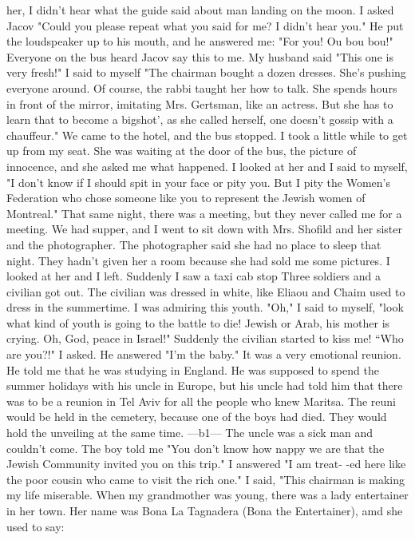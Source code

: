 her, I didn't hear what the guide said about man landing on the moon. 
I asked Jacov "Could you please repeat what you said for me? I didn't 
hear you." He put the loudspeaker up to his mouth, and he answered me: 
"For you! Ou bou bou!" Everyone on the bus heard Jacov say this to me. 
My husband said "This one is very fresh!" I said to myself "The chairman 
bought a dozen dresses. She's pushing everyone around. Of course, the 
rabbi taught her how to talk. She spends hours in front of the mirror, imitating Mrs. Gertsman, like an actress. But she has to learn that to become a bigshot', as she called herself, one doesn't gossip with a chauffeur." 
We came to the hotel, and the bus stopped. I took a little while to 
get up from my seat. She was waiting at the door of the bus, the picture 
of innocence, and she asked me what happened. I looked at her and I said 
to myself, "I don't know if I should spit in your face or pity you. But I 
pity the Women's Federation who chose someone like you to represent the 
Jewish women of Montreal." 
That same night, there was a meeting, but they never called me for a meeting. We had supper, and I went to sit down with Mrs. Shofild and her sister and the photographer. The photographer said she had no place to sleep that night. They hadn't given her a room because she had sold me 
some pictures. I looked at her and I left. Suddenly I saw a taxi cab stop 
Three soldiers and a civilian got out. The civilian was dressed in white, 
like Eliaou and Chaim used to dress in the summertime. I was admiring this 
youth. "Oh," I said to myself, "look what kind of youth is going to the 
battle to die! Jewish or Arab, his mother is crying. Oh, God, peace in 
Israel!" Suddenly the civilian started to kiss me! “Who are you?!" I 
asked. He answered "I'm the baby." It was a very emotional reunion. He 
told me that he was studying in England. He was supposed to spend the summer 
holidays with his uncle in Europe, but his uncle had told him that there was
to be a reunion in Tel Aviv for all the people who knew Maritsa. The reuni 
would be held in the cemetery, because one of the boys had died. They would 
hold the unveiling at the same time. 
—b1— 
The uncle was a sick man and couldn't come. The boy told me "You don't know how 
nappy we are that the Jewish Community invited you on this trip." I answered "I am treat-
-ed here like the poor cousin who came to visit the rich one." I said, "This chairman is 
making my life miserable. When my grandmother was young, there was a lady entertainer in 
her town. Her name was Bona La Tagnadera (Bona the Entertainer), amd she used to say: 
